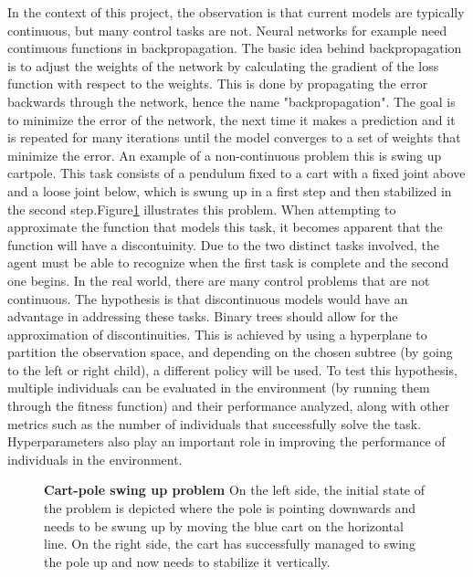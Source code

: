 In the context of this project, the observation is that current models are typically continuous, but many control tasks are not. Neural networks for example need continuous functions in backpropagation. The basic idea behind backpropagation is to adjust the weights of the network by calculating the gradient of the loss function with respect to the weights. This is done by propagating the error backwards through the network, hence the name "backpropagation". The goal is to minimize the error of the network, the next time it makes a prediction and it is repeated for many iterations until the model converges to a set of weights that minimize the error.
An example of a non-continuous problem this is swing up cartpole. This task consists of a pendulum fixed to a cart with a fixed joint above and a loose joint below, which is swung up in a first step and then stabilized in the second step.Figure\ref{fig:swing_up} illustrates this problem. When attempting to approximate the function that models this task, it becomes apparent that the function will have a discontuinity. Due to the two distinct tasks involved, the agent must be able to recognize when the first task is complete and the second one begins. In the real world, there are many control problems that are not continuous.
The hypothesis is that discontinuous models would have an advantage in addressing these tasks. Binary trees should allow for the approximation of discontinuities. This is achieved by using a hyperplane to partition the observation space, and depending on the chosen subtree (by going to the left or right child), a different policy will be used. To test this hypothesis, multiple individuals can be evaluated in the environment (by running them through the fitness function) and their performance analyzed, along with other metrics such as the number of individuals that successfully solve the task. Hyperparameters also play an important role in improving the performance of individuals in the environment.

\begin{figure}[!ht]
\centering
{}
\caption[Non-continuous control task]{
  \textbf{Cart-pole swing up problem} On the left side, the initial state of the problem is depicted where the pole is pointing downwards and needs to be swung up by moving the blue cart on the horizontal line. On the right side, the cart has successfully managed to swing the pole up and now needs to stabilize it vertically.
  }
\label{fig:swing_up}
\end{figure}

